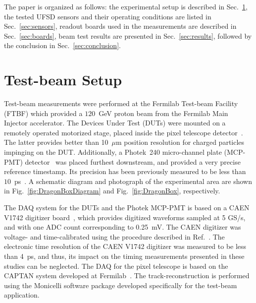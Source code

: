 \documentclass[preprint,1p]{elsarticle}
\begin{document}
The paper is organized as follows: the experimental setup is described in
Sec.~\ref{sec:setup}, the tested UFSD sensors and their operating conditions are
listed in Sec.~\ref{sec:sensors}, readout boards used in the measurements are described in Sec.~\ref{sec:boards}, beam test results are presented in Sec.~\ref{sec:results}, followed by the conclusion in Sec.~\ref{sec:conclusion}.

\section{Test-beam Setup} 
\label{sec:setup}


Test-beam measurements were performed at the Fermilab Test-beam Facility (FTBF)
which provided a $120$~GeV proton beam from the Fermilab Main Injector
accelerator. The Devices Under Test (DUTs) were mounted on a remotely operated
motorized stage, placed inside the pixel telescope detector~\cite{KWAN2016162}.
The latter provides better than 10~$\mu$m position resolution for charged
particles impinging on the DUT. Additionally, a Photek~240 micro-channel plate
(MCP-PMT) detector~\cite{Anderson:2015gha, MCPFastCaloNIMA,
Ronzhin2015288,Ronzhin201552} was placed furthest downstream, and provided a
very precise reference timestamp. Its precision has been previously
measured to be less than $10$~ps~\cite{Ronzhin2015288}. A schematic diagram and
photograph of the experimental area are shown in Fig.~\ref{fig:DragonBoxDiagram}
and Fig.~\ref{fig:DragonBox}, respectively. 

The DAQ system for the DUTs and the Photek MCP-PMT is based on a CAEN V1742
digitizer board~\cite{CAENDRS}, which provides digitized waveforms sampled at 5
GS/s, and with one ADC count corresponding to 0.25~mV. The CAEN digitizer was
voltage- and time-calibrated using the procedure described in
Ref.~\cite{Kim201467}. The electronic time resolution of the CAEN V1742
digitizer was measured to be less than 4~ps, and thus, its impact on the timing
measurements presented in these studies can be neglected. The DAQ for the pixel
telescope is based on the CAPTAN system developed at
Fermilab~\cite{KWAN2016162}. The track-reconstruction is performed using the
Monicelli software package developed specifically for the test-beam application. 
\end{document}
